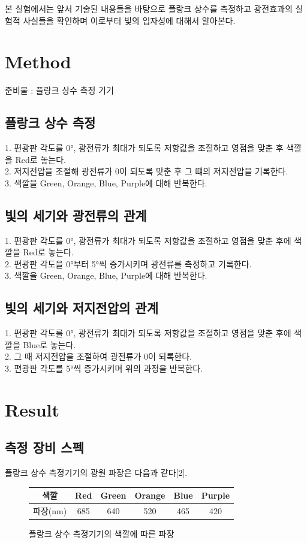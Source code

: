\documentclass[a4paper]{article}
\begin{document}
	본 실험에서는 앞서 기술된 내용들을 바탕으로 플랑크 상수를 측정하고 광전효과의 실험적 사실들을 확인하며 이로부터 빛의 입자성에 대해서 알아본다.

\section{Method}
	준비물 : 플랑크 상수 측정 기기
	\subsection{플랑크 상수 측정}
		1. 편광판 각도를 \ang{0}, 광전류가 최대가 되도록 저항값을 조절하고 영점을 맞춘 후 색깔을 Red로 놓는다. \\
		2. 저지전압을 조절해 광전류가 0이 되도록 맞춘 후 그 떄의 저지전압을 기록한다. \\
		3. 색깔을 Green, Orange, Blue, Purple에 대해 반복한다.

	\subsection{빛의 세기와 광전류의 관계}
		1. 편광판 각도를 \ang{0}, 광전류가 최대가 되도록 저항값을 조절하고 영점을 맞춘 후에 색깔을 Red로 놓는다. \\
		2. 편광판 각도을 \ang{0}부터 \ang{5}씩 증가시키며 광전류를 측정하고 기록한다. \\
		3. 색깔을 Green, Orange, Blue, Purple에 대해 반복한다.

	\subsection{빛의 세기와 저지전압의 관계}
		1. 편광판 각도를 \ang{0}, 광전류가 최대가 되도록 저항값을 조절하고 영점을 맞춘 후에 색깔을 Blue로 놓는다. \\
		2. 그 때 저지전압을 조절하여 광전류가 0이 되록한다. \\
		3. 편광판 각도를 \ang{5}씩 증가시키며 위의 과정을 반복한다. 

\section{Result}
	\subsection{측정 장비 스펙}
		플랑크 상수 측정기기의 광원 파장은 다음과 같다[2].
		\begin{figure}[h] 
		\centering
			\begin{tabular}{|c|c|c|c|c|c|}
				\hline 
				색깔 & Red & Green & Orange & Blue & Purple \\
				\hline
				파장(\si{nm}) & 685 & 640 & 520 & 465 & 420 \\ 
				\hline
			\end{tabular}
			\caption{플랑크 상수 측정기기의 색깔에 따른 파장}
		\end{figure}
\end{document}
